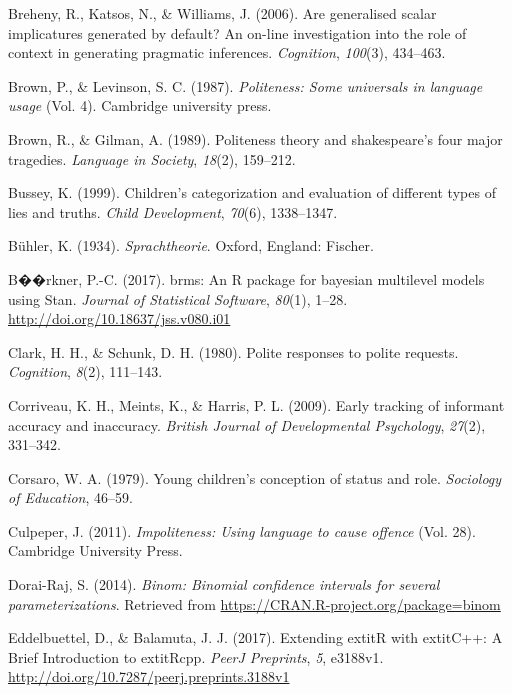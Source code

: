 \documentclass[oneside]{report}
\begin{document}
\hypertarget{ref-breheny2006}{}
Breheny, R., Katsos, N., \& Williams, J. (2006). Are generalised scalar
implicatures generated by default? An on-line investigation into the
role of context in generating pragmatic inferences. \emph{Cognition},
\emph{100}(3), 434--463.

\hypertarget{ref-brown1987}{}
Brown, P., \& Levinson, S. C. (1987). \emph{Politeness: Some universals
in language usage} (Vol. 4). Cambridge university press.

\hypertarget{ref-brown1989}{}
Brown, R., \& Gilman, A. (1989). Politeness theory and shakespeare's
four major tragedies. \emph{Language in Society}, \emph{18}(2),
159--212.

\hypertarget{ref-bussey1999}{}
Bussey, K. (1999). Children's categorization and evaluation of different
types of lies and truths. \emph{Child Development}, \emph{70}(6),
1338--1347.

\hypertarget{ref-buhler1934}{}
Bühler, K. (1934). \emph{Sprachtheorie}. Oxford, England: Fischer.

\hypertarget{ref-R-brms}{}
B��rkner, P.-C. (2017). brms: An R package for bayesian multilevel
models using Stan. \emph{Journal of Statistical Software}, \emph{80}(1),
1--28. \url{http://doi.org/10.18637/jss.v080.i01}

\hypertarget{ref-clark1980}{}
Clark, H. H., \& Schunk, D. H. (1980). Polite responses to polite
requests. \emph{Cognition}, \emph{8}(2), 111--143.

\hypertarget{ref-corriveau2009}{}
Corriveau, K. H., Meints, K., \& Harris, P. L. (2009). Early tracking of
informant accuracy and inaccuracy. \emph{British Journal of
Developmental Psychology}, \emph{27}(2), 331--342.

\hypertarget{ref-corsaro1979}{}
Corsaro, W. A. (1979). Young children's conception of status and role.
\emph{Sociology of Education}, 46--59.

\hypertarget{ref-culpeper2011}{}
Culpeper, J. (2011). \emph{Impoliteness: Using language to cause
offence} (Vol. 28). Cambridge University Press.

\hypertarget{ref-R-binom}{}
Dorai-Raj, S. (2014). \emph{Binom: Binomial confidence intervals for
several parameterizations}. Retrieved from
\url{https://CRAN.R-project.org/package=binom}

\hypertarget{ref-R-Rcpp_b}{}
Eddelbuettel, D., \& Balamuta, J. J. (2017). Extending extitR with
extitC++: A Brief Introduction to extitRcpp. \emph{PeerJ Preprints},
\emph{5}, e3188v1. \url{http://doi.org/10.7287/peerj.preprints.3188v1}
\end{document}
